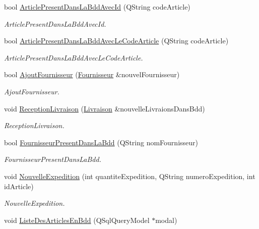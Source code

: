 \begin{DoxyCompactItemize}
\item 
bool \mbox{\hyperlink{class_database_a84330285ff6131c5d496d9b7d8b277b1}{Article\+Present\+Dans\+La\+Bdd\+Avec\+Id}} (Q\+String code\+Article)
\begin{DoxyCompactList}\small\item\em Article\+Present\+Dans\+La\+Bdd\+Avec\+Id. \end{DoxyCompactList}\item 
bool \mbox{\hyperlink{class_database_a5965471d637e973abba80f63f6aecb8d}{Article\+Present\+Dans\+La\+Bdd\+Avec\+Le\+Code\+Article}} (Q\+String code\+Article)
\begin{DoxyCompactList}\small\item\em Article\+Present\+Dans\+La\+Bdd\+Avec\+Le\+Code\+Article. \end{DoxyCompactList}\item 
bool \mbox{\hyperlink{class_database_a65fc4eaa1a4255b3ae0a5ccff9a24303}{Ajout\+Fournisseur}} (\mbox{\hyperlink{class_fournisseur}{Fournisseur}} \&nouvel\+Fournisseur)
\begin{DoxyCompactList}\small\item\em Ajout\+Fournisseur. \end{DoxyCompactList}\item 
void \mbox{\hyperlink{class_database_a0c0cd5c7401905883258019cdd18f6bd}{Reception\+Livraison}} (\mbox{\hyperlink{class_livraison}{Livraison}} \&nouvelle\+Livraions\+Dans\+Bdd)
\begin{DoxyCompactList}\small\item\em Reception\+Livraison. \end{DoxyCompactList}\item 
bool \mbox{\hyperlink{class_database_a83a103a11c2b982427ffae7eb11ea167}{Fournisseur\+Present\+Dans\+La\+Bdd}} (Q\+String nom\+Fournisseur)
\begin{DoxyCompactList}\small\item\em Fournisseur\+Present\+Dans\+La\+Bdd. \end{DoxyCompactList}\item 
void \mbox{\hyperlink{class_database_a6ba85382af93e1bc7cb32e84f6fcea3b}{Nouvelle\+Expedition}} (int quantite\+Expedition, Q\+String numero\+Expedition, int id\+Article)
\begin{DoxyCompactList}\small\item\em Nouvelle\+Expedition. \end{DoxyCompactList}\item 
void \mbox{\hyperlink{class_database_ab2c30b7afdf7bfd699a142739c66e447}{Liste\+Des\+Articles\+En\+Bdd}} (Q\+Sql\+Query\+Model $\ast$modal)

\end{DoxyCompactItemize}
